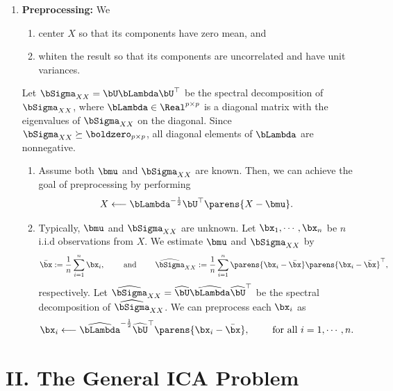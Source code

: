 \documentclass[12pt]{article}
\begin{document}
\begin{enumerate}[label=\textbf{\arabic*.}]
	\item \textbf{Preprocessing:} We 
	\begin{enumerate}
		\item center $X$ so that its components have zero mean, and 
		\item whiten the result so that its components are uncorrelated and have unit variances. 
	\end{enumerate}
	Let $\bSigma_{XX} = \bU \bLambda \bU^\top$ be the spectral decomposition of $\bSigma_{XX}$, where $\bLambda \in \Real^{p \times p}$ is a diagonal matrix with the eigenvalues of $\bSigma_{XX}$ on the diagonal. Since $\bSigma_{XX} \succeq \boldzero_{p \times p}$, all diagonal elements of $\bLambda$ are nonnegative. 
	\begin{enumerate}
		\item Assume both $\bmu$ and $\bSigma_{XX}$ are known. Then, we can achieve the goal of preprocessing by performing 
		\begin{align}
			X \longleftarrow \bLambda^{-\frac{1}{2}} \bU^\top \parens{X - \bmu}. 
		\end{align}
		\item Typically, $\bmu$ and $\bSigma_{XX}$ are unknown. Let $\bx_1, \cdots, \bx_n$ be $n$ i.i.d observations from $X$. We estimate $\bmu$ and $\bSigma_{XX}$ by 
		\begin{align*}
			\bar{\bx} := \frac{1}{n} \sum_{i=1}^n \bx_i, \qquad \text{ and } \qquad \widehat{\bSigma}_{XX} := \frac{1}{n} \sum_{i=1}^n \parens{\bx_i - \bar{\bx}} \parens{\bx_i - \bar{\bx}}^\top, 
		\end{align*}
		respectively. Let $\widehat{\bSigma}_{XX} = \widehat{\bU} \widehat{\bLambda} \widehat{\bU}^\top$ be the spectral decomposition of $\widehat{\bSigma}_{XX}$. We can preprocess each $\bx_i$ as 
		\begin{align*}
			\bx_i \longleftarrow \widehat{\bLambda}^{-\frac{1}{2}} \widehat{\bU}^\top \parens{\bx_i - \bar{\bx}}, \qquad \text{ for all } i = 1, \cdots, n. 
		\end{align*}
	\end{enumerate}

\end{enumerate}


\section*{II. The General ICA Problem}
\end{document}
